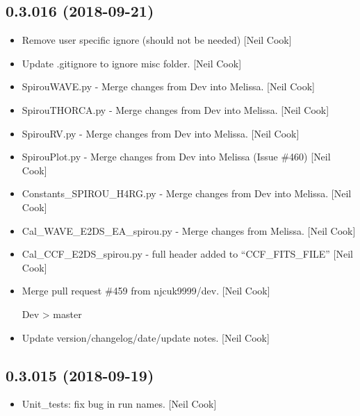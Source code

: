 \documentclass[a4paper,10pt,english]{report}
\begin{document}
\subsection{0.3.016 (2018-09-21)}
\label{\detokenize{misc/changelog:id314}}\begin{itemize}
\item {} 
Remove user specific ignore (should not be needed) {[}Neil Cook{]}

\item {} 
Update .gitignore to ignore misc folder. {[}Neil Cook{]}

\item {} 
SpirouWAVE.py - Merge changes from Dev into Melissa. {[}Neil Cook{]}

\item {} 
SpirouTHORCA.py - Merge changes from Dev into Melissa. {[}Neil Cook{]}

\item {} 
SpirouRV.py - Merge changes from Dev into Melissa. {[}Neil Cook{]}

\item {} 
SpirouPlot.py - Merge changes from Dev into Melissa (Issue \#460) {[}Neil
Cook{]}

\item {} 
Constants\_SPIROU\_H4RG.py - Merge changes from Dev into Melissa. {[}Neil
Cook{]}

\item {} 
Cal\_WAVE\_E2DS\_EA\_spirou.py - Merge changes from Melissa. {[}Neil Cook{]}

\item {} 
Cal\_CCF\_E2DS\_spirou.py - full header added to “CCF\_FITS\_FILE” {[}Neil
Cook{]}

\item {} 
Merge pull request \#459 from njcuk9999/dev. {[}Neil Cook{]}

Dev \textendash{}\textgreater{} master

\item {} 
Update version/changelog/date/update notes. {[}Neil Cook{]}

\end{itemize}


\subsection{0.3.015 (2018-09-19)}
\label{\detokenize{misc/changelog:id315}}\begin{itemize}
\item {} 
Unit\_tests: fix bug in run names. {[}Neil Cook{]}

\end{itemize}
\end{document}
